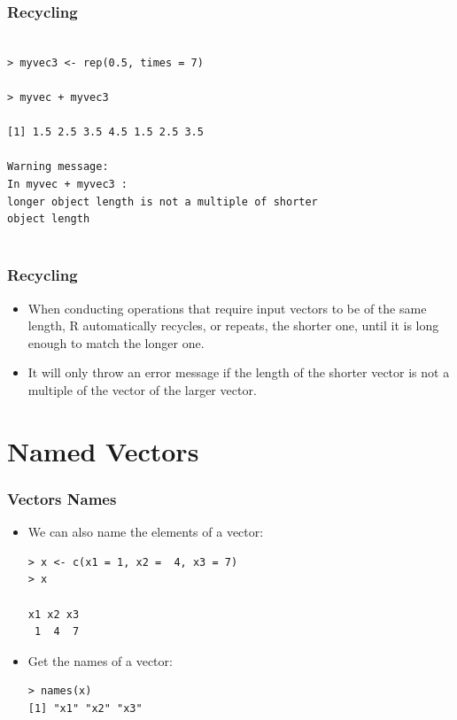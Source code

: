 \documentclass[xcolor=dvipsnames, xcolor=table]{beamer} %
\theoremstyle{mystyle}
\begin{document}
\begin{frame}[fragile] %
\frametitle{Recycling}
\begin{verbatim}

> myvec3 <- rep(0.5, times = 7)

> myvec + myvec3

[1] 1.5 2.5 3.5 4.5 1.5 2.5 3.5

Warning message:
In myvec + myvec3 :
longer object length is not a multiple of shorter
object length
  
\end{verbatim}
\end{frame}

\begin{frame}
\frametitle{Recycling}
\begin{itemize}
\item  When conducting operations that require input vectors to be of the same length, R automatically recycles, or repeats, the shorter one, until it is long enough to match the longer one.
\item  It will only throw an error message if the length of the shorter vector is not a multiple of the vector of the larger vector.
\end{itemize}

\end{frame}

\section{Named Vectors}

\begin{frame}[fragile]
\frametitle{Vectors Names}
\begin{itemize}
\item We can also name the elements of a vector:

\begin{verbatim}
> x <- c(x1 = 1, x2 =  4, x3 = 7)
> x

x1 x2 x3 
 1  4  7 
\end{verbatim}
\item Get the names of a vector:

\begin{verbatim}
> names(x)
[1] "x1" "x2" "x3"
\end{verbatim}
\end{itemize}

\end{frame}
\end{document}
